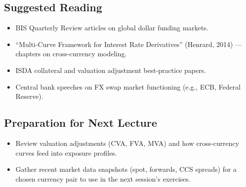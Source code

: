 \documentclass[11pt]{article}
\begin{document}
\subsection{Suggested Reading}
\begin{itemize}[leftmargin=*]
  \item BIS Quarterly Review articles on global dollar funding markets.
  \item ``Multi-Curve Framework for Interest Rate Derivatives'' (Henrard, 2014) --- chapters on cross-currency modeling.
  \item ISDA collateral and valuation adjustment best-practice papers.
  \item Central bank speeches on FX swap market functioning (e.g., ECB, Federal Reserve).
\end{itemize}

\subsection{Preparation for Next Lecture}
\begin{itemize}[leftmargin=*]
  \item Review valuation adjustments (CVA, FVA, MVA) and how cross-currency curves feed into exposure profiles.
  \item Gather recent market data snapshots (spot, forwards, CCS spreads) for a chosen currency pair to use in the next session's exercises.
\end{itemize}
\end{document}
